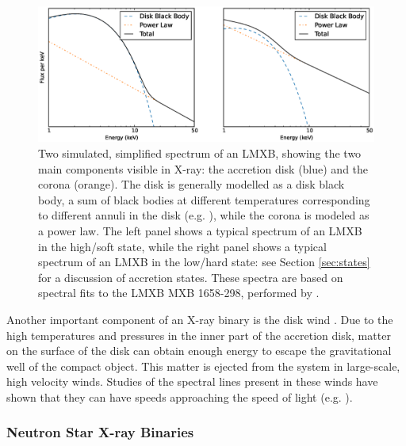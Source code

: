 \begin{figure}
   \centering
    \includegraphics[width=\columnwidth, trim = 10mm 0mm 10mm 10mm, clip]{images/2toyspec.eps}
    \captionsetup{singlelinecheck=off}
    \caption[Two simulated, simplified spectra of an LMXB, showing the two main components visible in X-ray: the accretion disk and the corona.]{Two simulated, simplified spectrum of an LMXB, showing the two main components visible in X-ray: the accretion disk (blue) and the corona (orange).  The disk is generally modelled as a disk black body, a sum of black bodies at different temperatures corresponding to different annuli in the disk (e.g. \citealp{Mitsuda_diskbb}), while the corona is modeled as a power law.  The left panel shows a typical spectrum of an LMXB in the high/soft state, while the right panel shows a typical spectrum of an LMXB in the low/hard state: see Section \ref{sec:states} for a discussion of accretion states.  These spectra are based on spectral fits to the LMXB MXB 1658-298, performed by \citet{Sharma_vals}.}
   \label{fig:toyspec}
\end{figure}

\par Another important component of an X-ray binary is the disk wind \citep{vanParadijs_Wind}.  Due to the high temperatures and pressures in the inner part of the accretion disk, matter on the surface of the disk can obtain enough energy to escape the gravitational well of the compact object.  This matter is ejected from the system in large-scale, high velocity winds.  Studies of the spectral lines present in these winds have shown that they can have speeds approaching the speed of light (e.g. \citealp{Ponti_Wind,Degenaar_BPSpec}).

\subsubsection{Neutron Star X-ray Binaries}

